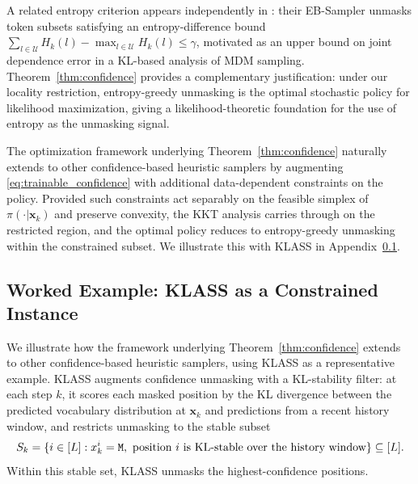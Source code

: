 \begin{remark}
A related entropy criterion appears independently in \citet{benhamu2025eb}: their EB-Sampler unmasks token subsets satisfying an entropy-difference bound $\sum_{l\in\mathcal U}H_k(l)-\max_{l\in\mathcal U}H_k(l)\leq\gamma$, motivated as an upper bound on joint dependence error in a KL-based analysis of MDM sampling. Theorem~\ref{thm:confidence} provides a complementary justification: under our locality restriction, entropy-greedy unmasking is the optimal stochastic policy for likelihood maximization, giving a likelihood-theoretic foundation for the use of entropy as the unmasking signal.
\end{remark}

\begin{remark}
The optimization framework underlying Theorem~\ref{thm:confidence} naturally extends to other confidence-based heuristic samplers by augmenting \eqref{eq:trainable_confidence} with additional data-dependent constraints on the policy. Provided such constraints act separably on the feasible simplex of $\pi(\cdot|\bm x_k)$ and preserve convexity, the KKT analysis carries through on the restricted region, and the optimal policy reduces to entropy-greedy unmasking within the constrained subset. We illustrate this with KLASS \citep{kim2025klass} in Appendix~\ref{subsec:klass-extension}.
\end{remark}

\subsection{Worked Example: KLASS as a Constrained Instance}\label{subsec:klass-extension}

We illustrate how the framework underlying Theorem~\ref{thm:confidence} extends to other confidence-based heuristic samplers, using KLASS \citep{kim2025klass} as a representative example. KLASS augments confidence unmasking with a KL-stability filter: at each step $k$, it scores each masked position by the KL divergence between the predicted vocabulary distribution at $\bm x_k$ and predictions from a recent history window, and restricts unmasking to the stable subset
\begin{align*}
    S_k = \{i \in [L] : x_k^i = \texttt{M},\ \text{position } i \text{ is KL-stable over the history window}\} \subseteq [L].
\end{align*}
Within this stable set, KLASS unmasks the highest-confidence positions.

